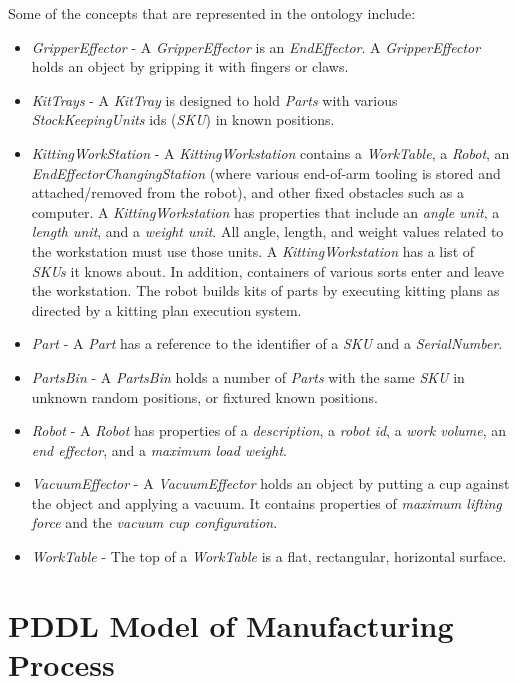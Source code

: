 \documentclass[a4paper, 10pt, conference]{ieeeconf}      %
\begin{document}
Some of the concepts that are represented in the ontology include:
\begin{itemize}
\item	{\it GripperEffector} - A {\it GripperEffector} is an {\it EndEffector}. A {\it GripperEffector} holds an object by gripping it with fingers or claws.
\item	{\it KitTrays} - A {\it KitTray} is designed to hold {\it Parts} with various {\it StockKeepingUnits} ids ({\it SKU}) in known positions.
\item	{\it KittingWorkStation} - A {\it KittingWorkstation} contains a {\it WorkTable}, a {\it Robot}, an {\it EndEffectorChangingStation} (where various end-of-arm tooling is stored and attached/removed from the robot), and other fixed obstacles such as a computer. A {\it KittingWorkstation} has properties that include an {\it angle unit}, a {\it length unit}, and a {\it weight unit}. All angle, length, and weight values related to the workstation must use those units. A {\it KittingWorkstation} has a list of {\it SKUs} it knows about. In addition, containers of various sorts enter and leave the workstation.  The robot builds kits of parts by executing kitting plans as directed by a kitting plan execution system.
\item	{\it Part} - A {\it Part} has a reference to the identifier of a {\it SKU} and a {\it SerialNumber}.
\item	{\it PartsBin} - A {\it PartsBin} holds a number of {\it Parts} with the same {\it SKU} in unknown random positions, or fixtured known positions.
\item	{\it Robot} - A {\it Robot} has properties of a {\it description}, a {\it robot id}, a {\it work volume}, an {\it end effector}, and a {\it maximum load weight}.
\item	{\it VacuumEffector} - A {\it VacuumEffector} holds an object by putting a cup against the object and applying a vacuum. It contains properties of {\it maximum lifting force} and the {\it vacuum cup configuration}.
\item	 {\it WorkTable} - The top of a {\it WorkTable} is a flat, rectangular, horizontal surface.
\end{itemize}


\section{PDDL Model of Manufacturing Process}
\label{sect:PDDL_Layer}

\end{document}
